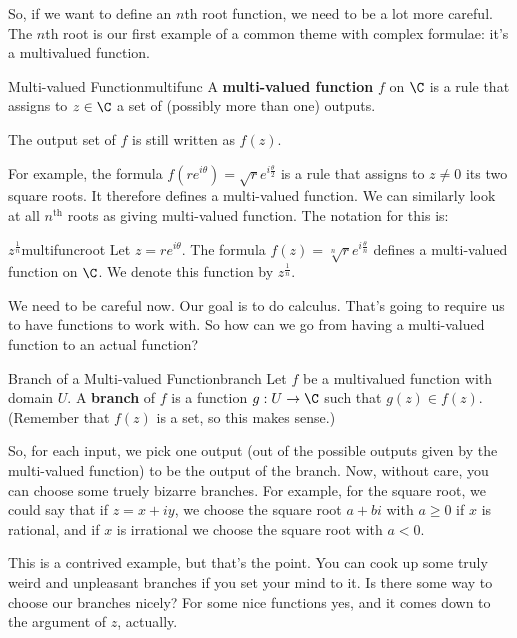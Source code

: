 So, if we want to define an $n$th root function, we need to be a lot more careful. The $n$th root is our first example of a common theme with complex formulae: it's a multivalued function.

\begin{defbo}{Multi-valued Function}{multifunc} A {\bf multi-valued function} $f$ on $\C$ is a rule that assigns to $z \in \C$ a set of (possibly more than one) outputs.

The output set of $f$ is still written as $f(z)$.
\end{defbo}

For example, the formula $f(re^{i\theta}) = \sqrt{r}e^{i\frac{\theta}{2}}$ is a rule that assigns to $z\ne 0$ its two square roots. It therefore defines a multi-valued function. We can similarly look at all $n^\text{th}$ roots as giving multi-valued function. The notation for this is:

\begin{defbo}{$z^{\frac{1}{n}}$}{multifuncroot}
Let $z = re^{i\theta}$. The formula $f(z) = \sqrt[n]{r}e^{i\frac{\theta}{n}}$ defines a multi-valued function on $\C$. We denote this function by $z^{\frac{1}{n}}$.
\end{defbo}


We need to be careful now. Our goal is to do calculus. That's going to require us to have functions to work with. So how can we go from having a multi-valued function to an actual function?

\begin{defbo}{Branch of a Multi-valued Function}{branch} 
Let $f$ be a multivalued function with domain $U$. A {\bf branch} of $f$ is a function $g:U\rightarrow \C$ such that $g(z) \in f(z)$. (Remember that $f(z)$ is a set, so this makes sense.)
\end{defbo}

So, for each input, we pick one output (out of the possible outputs given by the multi-valued function) to be the output of the branch. Now, without care, you can choose some truely bizarre branches. For example, for the square root, we could say that if $z = x + iy$, we choose the square root $a+ bi$ with $a \ge 0$ if $x$ is rational, and if $x$ is irrational we choose the square root with $a < 0$.

This is a contrived example, but that's the point. You can cook up some truly weird and unpleasant branches if you set your mind to it. Is there some way to choose our branches nicely? For some nice functions yes, and it comes down to the argument of $z$, actually.

